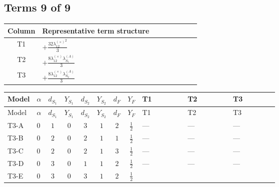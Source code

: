 \documentclass[8pt]{article}
\begin{document}
\begin{landscape}
\subsection*{Terms 9 of 9}
\begin{center}
\begin{tabular}{@{}c >{\raggedright\arraybackslash}p{0.82\linewidth}@{}}
\toprule
Column & Representative term structure \\
\midrule
T1 & \(\displaystyle +\frac{32 {\lambda_{12}^{(\times)}}^2}{3}\) \\
\midrule
T2 & \(\displaystyle +\frac{8 {\lambda_{12}^{(\times)}} {\lambda_{S_1}^{(A)}}}{3}\) \\
\midrule
T3 & \(\displaystyle +\frac{8 {\lambda_{12}^{(\times)}} {\lambda_{S_2}^{(A)}}}{3}\) \\
\midrule
\bottomrule
\end{tabular}
\end{center}
\smallskip
\tiny
\begin{longtable}{@{}llcccccc >{\raggedright\arraybackslash}p{0.21\linewidth} >{\raggedright\arraybackslash}p{0.21\linewidth} >{\raggedright\arraybackslash}p{0.21\linewidth}@{}}
\toprule
Model & $\alpha$ & $d_{S_1}$ & $Y_{S_1}$ & $d_{S_2}$ & $Y_{S_2}$ & $d_F$ & $Y_F$ & T1 & T2 & T3 \\
\midrule
\endfirsthead
\toprule
Model & $\alpha$ & $d_{S_1}$ & $Y_{S_1}$ & $d_{S_2}$ & $Y_{S_2}$ & $d_F$ & $Y_F$ & T1 & T2 & T3 \\
\midrule
\endhead
T3-A & $0$ & $1$ & $0$ & $3$ & $1$ & $2$ & $\frac{1}{2}$ & --- & --- & --- \\
\midrule
T3-B & $0$ & $2$ & $0$ & $2$ & $1$ & $1$ & $\frac{1}{2}$ & --- & --- & --- \\
\midrule
T3-C & $0$ & $2$ & $0$ & $2$ & $1$ & $3$ & $\frac{1}{2}$ & --- & --- & --- \\
\midrule
T3-D & $0$ & $3$ & $0$ & $1$ & $1$ & $2$ & $\frac{1}{2}$ & --- & --- & --- \\
\midrule
T3-E & $0$ & $3$ & $0$ & $3$ & $1$ & $2$ & $\frac{1}{2}$ & \scriptsize\adjustbox{max width=\linewidth}{$\begin{gathered} +\frac{32 {\lambda_{12}^{(\times)}}^2}{3}\end{gathered}$} & \scriptsize\adjustbox{max width=\linewidth}{$\begin{gathered} +\frac{8 {\lambda_{12}^{(\times)}} {\lambda_{S_1}^{(A)}}}{3}\end{gathered}$} & \scriptsize\adjustbox{max width=\linewidth}{$\begin{gathered} +\frac{8 {\lambda_{12}^{(\times)}} {\lambda_{S_2}^{(A)}}}{3}\end{gathered}$} \\
\midrule
\bottomrule
\end{longtable}
\clearpage

\end{landscape}
\end{document}
